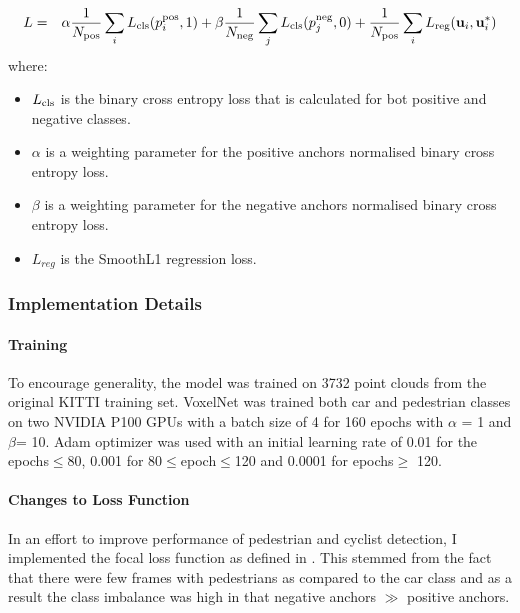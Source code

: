 \begin{eqnarray}
	 L & = & \alpha\frac{1}{N_{\text{\scriptsize pos}}} \sum\limits_{i} L_{\text{\scriptsize cls}}(p^{\text{\scriptsize pos}}_i, 1) + 
	\beta\frac{1}{N_{\text{\scriptsize neg}}} \sum\limits_{j} L_{\text{\scriptsize cls}}(p^{\text{\scriptsize neg}}_j, 0) \nonumber  + \frac{1}{N_{\text{\scriptsize pos}}} \sum\limits_{i} L_{\text{\scriptsize reg}}(\mathbf{u}_i, \mathbf{u}_i^*)	
	\label{eqn}
\end{eqnarray}
where:
\begin{itemize}[noitemsep]
	\item $L_{\text{\scriptsize cls}}$ is the binary cross entropy loss that is calculated for bot positive and negative classes. 
	\item $\alpha$ is a weighting parameter for the positive anchors normalised binary cross entropy loss. 
	\item $\beta$ is a weighting parameter for the negative anchors normalised binary cross entropy loss.
	\item $L_{reg}$ is the SmoothL1 regression loss.
\end{itemize}

\subsubsection{Implementation Details}
\paragraph{Training} 
To encourage generality, the model was trained on 3732 point clouds from the original KITTI training set.
VoxelNet was trained both car and pedestrian classes on two NVIDIA P100 GPUs with a batch size of 4 for 160 epochs  with $\alpha$ = 1 and  $\beta$= 10. Adam optimizer was used with an initial learning rate of 0.01 for the epochs$\le$80, 0.001 for 80$\le$epoch$\le$120 and 0.0001 for epochs$\ge$ 120. 


\paragraph{Changes to Loss Function }
In an effort to improve performance of pedestrian and cyclist detection, I implemented the focal loss function as defined in \cite{lin2018focal}. This stemmed from the fact that there were few frames with pedestrians as compared to the car class and as a result the class imbalance was high in that negative anchors $\gg$ positive anchors. 



